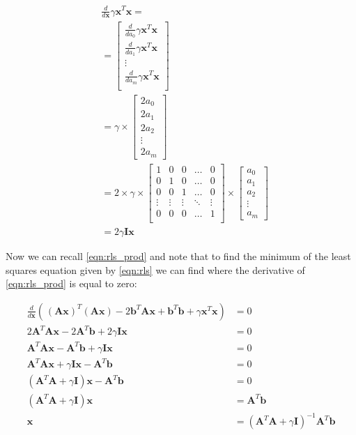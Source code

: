 \documentclass{article}
\newcommand{\x}{\mathbf{x}}
\newcommand{\A}{\mathbf{A}}
\newcommand{\B}{\mathbf{b}} %
\newcommand{\I}{\mathbf{I}}
\begin{document}
\begin{equation}
\begin{split}
    & \frac{d}{d\x} \gamma \x^T \x = \\
    & =
    \begin{bmatrix}
        \frac{d}{d a_0} \gamma \x^T \x \\
        \frac{d}{d a_1} \gamma \x^T \x \\
        \vdots \\
        \frac{d}{d a_m} \gamma \x^T \x \\
    \end{bmatrix}\\
    &= \gamma \times
    \begin{bmatrix}
        2 a_0 \\
        2 a_1 \\
        2 a_2 \\
        \vdots \\
        2 a_m
    \end{bmatrix}\\
    &= 2 \times \gamma \times
    \begin{bmatrix}
        1 & 0 & 0 & \ldots & 0\\
        0 & 1 & 0 & \ldots & 0\\
        0 & 0 & 1 & \ldots & 0\\
        \vdots & \vdots & \vdots & \ddots & \vdots \\
        0 & 0 & 0 & \ldots & 1\\
    \end{bmatrix}
    \times
    \begin{bmatrix}
        a_0 \\
        a_1 \\
        a_2 \\
        \vdots \\
        a_m
    \end{bmatrix}\\
    &= 2 \gamma \I \x
\end{split}
\end{equation}

Now we can recall \ref{eqn:rls_prod} and note that to find the minimum of the least squares equation given by \ref{eqn:rls} we can find where the derivative of \ref{eqn:rls_prod} is equal to zero:

\begin{equation}
\begin{split}
    \frac{d}{d \x} (\frac{}{}(\A\x)^T(\A\x) -2 \B^T \A\x + \B^T \B + \gamma \x^T \x) &= 0 \\
    2 \A ^T \A \x - 2 \A ^T \B + 2 \gamma \I \x &= 0 \\
    \A ^T \A \x - \A ^T \B + \gamma \I \x &= 0 \\
    \A ^T \A \x + \gamma \I \x - \A ^T \B &= 0 \\
    ( \A ^T \A + \gamma \I ) \x - \A ^T \B &= 0 \\
    ( \A ^T \A + \gamma \I ) \x  &= \A ^T \B \\
    \x &= ( \A ^T \A + \gamma \I )^{-1} \A ^T \B  \\
\end{split}
\end{equation}
\end{document}
